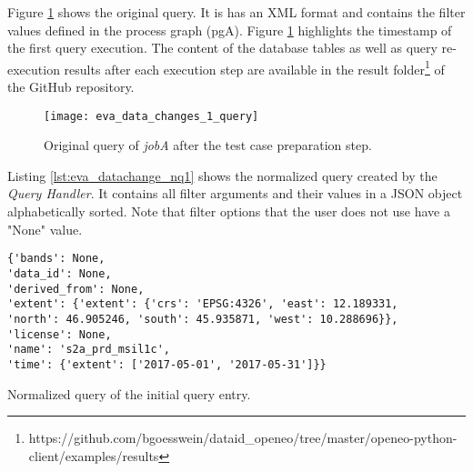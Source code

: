 \documentclass[draft,final]{vutinfth} %
\newenvironment{code}{\captionsetup{type=listing}}{}
\begin{document}
\begin{enumerate}
	Figure \ref{fig:eva_data_changes_1_query} shows the original query. It is has an XML format and contains the filter values defined in the process graph (pgA). Figure \ref{fig:eva_data_changes_1_query} highlights the timestamp of the first query execution. The content of the database tables as well as query re-execution results after each execution step are available in the result folder\footnote{https://github.com/bgoesswein/dataid\_openeo/tree/master/openeo-python-client/examples/results} of the GitHub repository. 
	
	\begin{figure}[h]
		\centering
		\texttt{[image: eva\_data\_changes\_1\_query]}
		\caption{Original query of \textit{jobA} after the test case preparation step.}
		\label{fig:eva_data_changes_1_query} %
	\end{figure}
	
	Listing \ref{lst:eva_datachange_nq1} shows the normalized query created by the \textit{Query Handler}. It contains all filter arguments and their values in a JSON object alphabetically sorted. Note that filter options that the user does not use have a "None" value.
	
	\begin{code}
		\begin{verbatim}
{'bands': None, 
'data_id': None, 
'derived_from': None, 
'extent': {'extent': {'crs': 'EPSG:4326', 'east': 12.189331, 
'north': 46.905246, 'south': 45.935871, 'west': 10.288696}}, 
'license': None, 
'name': 's2a_prd_msil1c', 
'time': {'extent': ['2017-05-01', '2017-05-31']}}
		\end{verbatim}
		\caption{Normalized query of the initial query entry.}
		\label{lst:eva_datachange_nq1}
	\end{code}
	

\end{enumerate}
\end{document}
